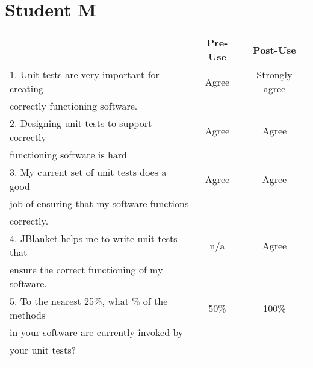 \pagebreak

\section{Student M}

\begin{tabular}{lcc} \\
 & {\bf Pre-Use} & {\bf Post-Use} \\ \hline
1. Unit tests are very important for creating & Agree & Strongly agree \\
   correctly functioning software. \\ \hline

2. Designing unit tests to support correctly & Agree & Agree \\
   functioning software is hard\\ \hline

3. My current set of unit tests does a good & Agree & Agree \\
   job of ensuring that my software functions \\
   correctly.\\ \hline

4. JBlanket helps me to write unit tests that & n/a & Agree \\
   ensure the correct functioning of my software.\\ \hline

5. To the nearest 25\%, what \% of the methods & 50\% & 100\% \\
   in your software are currently invoked by \\
   your unit tests?\\ \hline
\\
\end{tabular}

